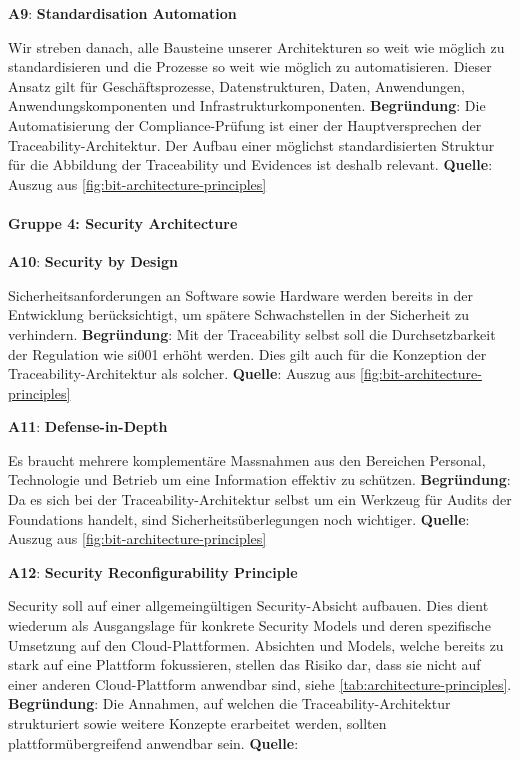 \textbf{A9}: \textbf{Standardisation Automation} \hypertarget{architecture-a9}{}

Wir streben danach, alle Bausteine unserer Architekturen so weit wie möglich zu standardisieren und die Prozesse so weit wie möglich zu automatisieren. Dieser Ansatz gilt für Geschäftsprozesse, Datenstrukturen, Daten, Anwendungen, Anwendungskomponenten und Infrastrukturkomponenten.
\textbf{Begründung}: Die Automatisierung der Compliance-Prüfung ist einer der Hauptversprechen der Traceability-Architektur. Der Aufbau einer möglichst standardisierten Struktur für die Abbildung der Traceability und Evidences ist deshalb relevant.
\textbf{Quelle}: Auszug aus \autoref{fig:bit-architecture-principles}

\paragraph{Gruppe 4: Security Architecture}

\textbf{A10}: \textbf{Security by Design} \hypertarget{architecture-a10}{}

Sicherheitsanforderungen an Software sowie Hardware werden bereits in der Entwicklung berücksichtigt, um spätere Schwachstellen in der Sicherheit zu verhindern.
\textbf{Begründung}: Mit der Traceability selbst soll die Durchsetzbarkeit der Regulation wie \ac{si001} erhöht werden. Dies gilt auch für die Konzeption der Traceability-Architektur als solcher.
\textbf{Quelle}: Auszug aus \autoref{fig:bit-architecture-principles}

\textbf{A11}: \textbf{Defense-in-Depth} \hypertarget{architecture-a11}{}

Es braucht mehrere komplementäre Massnahmen aus den Bereichen Personal, Technologie und Betrieb um eine Information effektiv zu schützen.
\textbf{Begründung}: Da es sich bei der Traceability-Architektur selbst um ein Werkzeug für Audits der Foundations handelt, sind Sicherheitsüberlegungen noch wichtiger.
\textbf{Quelle}: Auszug aus \autoref{fig:bit-architecture-principles}

\textbf{A12}: \textbf{Security Reconfigurability Principle} \hypertarget{architecture-a12}{}

Security soll auf einer allgemeingültigen Security-Absicht aufbauen. Dies dient wiederum als Ausgangslage für konkrete Security Models und deren spezifische Umsetzung auf den Cloud-Plattformen. Absichten und Models, welche bereits zu stark auf eine Plattform fokussieren, stellen das Risiko dar, dass sie nicht auf einer anderen Cloud-Plattform anwendbar sind, siehe \autoref{tab:architecture-principles}.
\textbf{Begründung}: Die Annahmen, auf welchen die Traceability-Architektur strukturiert sowie weitere Konzepte erarbeitet werden, sollten plattformübergreifend anwendbar sein.
\textbf{Quelle}: \cite{hajjat_cloudward_2010}

